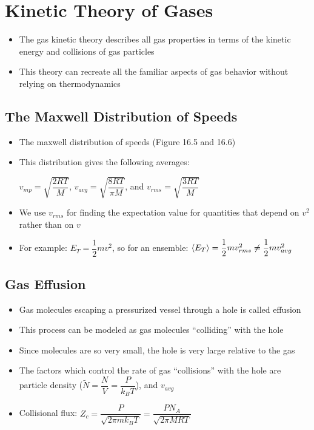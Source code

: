 \documentclass[12pt, openany, letterpaper]{memoir}
\begin{document}
\chapter{Kinetic Theory of Gases}
\begin{itemize}
	\item The gas kinetic theory describes all gas properties in terms of the kinetic energy and collisions of gas particles
	\item This theory can recreate all the familiar aspects of gas behavior without relying on thermodynamics
\end{itemize}
\section*{The Maxwell Distribution of Speeds}
\begin{itemize}
	\item The maxwell distribution of speeds (Figure 16.5 and 16.6)
	\item This distribution gives the following averages: 
	
	$v_{mp} = \sqrt{\dfrac{2RT}{M}}$, $v_{avg}=\sqrt{\dfrac{8RT}{\pi M}}$, and $v_{rms} = \sqrt{\dfrac{3RT}{M}}$	
	\item We use $v_{rms}$ for finding the expectation value for quantities that depend on $v^2$ rather than on $v$
	\item For example: $E_T = \dfrac{1}{2}mv^2$, so for an ensemble: $\left< E_T \right>=\dfrac{1}{2}mv_{rms}^2\neq\dfrac{1}{2}mv_{avg}^2$
\end{itemize}
\section*{Gas Effusion}
\begin{itemize}
	\item Gas molecules escaping a pressurized vessel through a hole is called effusion
	\item This process can be modeled as gas molecules ``colliding'' with the hole
	\item Since molecules are so very small, the hole is very large relative to the gas
	\item The factors which control the rate of gas ``collisions'' with the hole are particle density ($\tilde{N} = \dfrac{N}{V} = \dfrac{P}{k_BT}$), and $v_{avg}$
	\item Collisional flux: $Z_c=\dfrac{P}{\sqrt{2\pi mk_BT}}=\dfrac{PN_A}{\sqrt{2\pi MRT}}$
\end{itemize}
\end{document}
